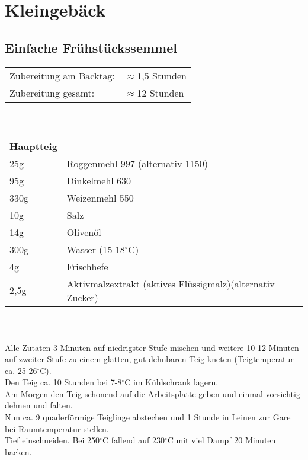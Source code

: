 
\chapter[Semmeln, Brezen und Co.]{Kleingebäck}


\section{Einfache Frühstückssemmel}
\begin{tabular}{ll}
    Zubereitung am Backtag: & $\approx$1,5 Stunden \\
    Zubereitung gesamt:     & $\approx$12 Stunden
\end{tabular}\\

\paragraph{}
\begin{tabular}{ll}
    \textbf{Hauptteig} \\
    25g  & Roggenmehl 997 (alternativ 1150)                          \\
    95g  & Dinkelmehl 630                                            \\
    330g & Weizenmehl 550                                            \\
    10g  & Salz                                                      \\
    14g  & Olivenöl                                                  \\
    300g & Wasser (15-18$^\circ$C)                                   \\
    4g   & Frischhefe                                                \\
    2,5g & Aktivmalzextrakt (aktives Flüssigmalz)(alternativ Zucker)
\end{tabular}\\

\paragraph{}
Alle Zutaten 3 Minuten auf niedrigster Stufe mischen und weitere 10-12 Minuten auf zweiter Stufe zu einem glatten, gut dehnbaren Teig kneten (Teigtemperatur ca. 25-26$^\circ$C). \\
Den Teig ca. 10 Stunden bei 7-8$^\circ$C im Kühlschrank lagern. \\
Am Morgen den Teig schonend auf die Arbeitsplatte geben und einmal vorsichtig dehnen und falten. \\
Nun ca. 9 quaderförmige Teiglinge abstechen und 1 Stunde in Leinen zur Gare bei Raumtemperatur stellen. \\
Tief einschneiden. Bei 250$^\circ$C fallend auf 230$^\circ$C mit viel Dampf 20 Minuten backen.\\\newpage


